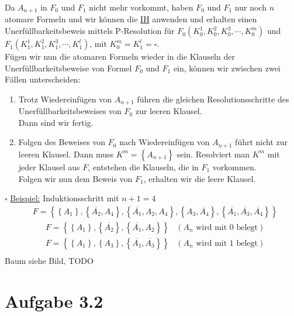 \documentclass[a4paper,12pt]{article}
\begin{document}
	Da $A_{n+1}$ in $F_0$ und $F_1$ nicht mehr vorkommt, haben $F_0$ und $F_1$ nur noch $n$ atomare Formeln und wir können die \underline{IH} anwenden und erhalten einen Unerfüllbarkeitsbeweis mittels P-Resolution für $F_0 \left(K_0^1, K_0^2, K_0^3, \cdots, K_0^m\right)$ und $F_1 \left(K_1^1, K_1^2, K_1^3, \cdots, K_1^l\right)$, mit $K_0^m = K_1^l = \square$.\\
	Fügen wir nun die atomaren Formeln wieder in die Klauseln der Unerfüllbarkeitsbeweise von Formel $F_0$ und $F_1$ ein, können wir zwischen zwei Fällen unterscheiden:
	\begin{enumerate}[1.]
		\item Trotz Wiedereinfügen von $A_{n+1}$ führen die gleichen Resolutionsschritte des Unerfüllbarkeitsbeweises von $F_0$ zur leeren Klausel.\\
		Dann sind wir fertig.
		\item Folgen des Beweises von $F_0$ nach Wiedereinfügen von $A_{n+1}$ führt nicht zur leeren Klausel. Dann muss $K^m = \left\lbrace A_{n+1}\right\rbrace$ sein. Resolviert man $K^m$ mit jeder Klausel aus $F$, entstehen die Klauseln, die in $F_1$ vorkommen.\\
		Folgen wir nun dem Beweis von $F_1$, erhalten wir die leere Klausel.
	\end{enumerate}
	\hfill $\square$
	\newpage
	\underline{Beispiel:} Induktionsschritt mit $n+1 = 4$
	\begin{align*}
		&F = \left\lbrace \left\lbrace A_1\right\rbrace, \left\lbrace \overline{A_2}, A_4\right\rbrace, \left\lbrace \overline{A_1}, A_2, A_4\right\rbrace, \left\lbrace A_3, \overline{A_4}\right\rbrace, \left\lbrace \overline{A_1}, \overline{A_3}, \overline{A_4}\right\rbrace\right\rbrace
	\end{align*}
	\begin{align*}
		&F = \left\lbrace \left\lbrace A_1\right\rbrace, \left\lbrace \overline{A_2}\right\rbrace, \left\lbrace \overline{A_1}, A_2\right\rbrace\right\rbrace &\left( A_n \text{ wird mit 0 belegt}\right)\\
		&F = \left\lbrace \left\lbrace A_1\right\rbrace, \left\lbrace A_3\right\rbrace, \left\lbrace \overline{A_1}, \overline{A_3}\right\rbrace\right\rbrace &\left( A_n \text{ wird mit 1 belegt}\right)\\
	\end{align*}
	Baum siehe Bild, TODO
	
	\section*{Aufgabe 3.2}
\end{document}
